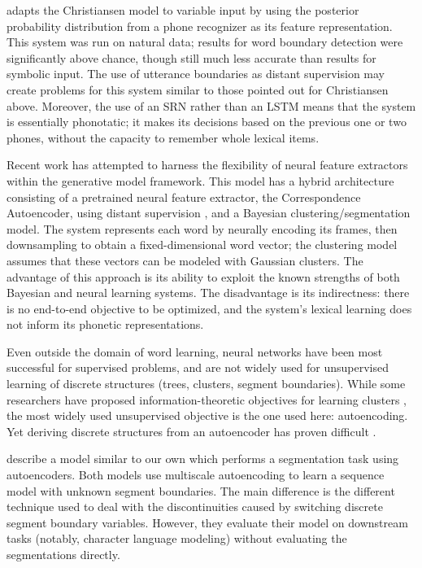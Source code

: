 \documentclass[11pt,letterpaper]{article}
\begin{document}
 adapts the Christiansen model to variable input by
using the posterior probability distribution from a phone recognizer
as its feature representation. This system was run on natural data;
results for word boundary detection were significantly above chance,
though still much less accurate than results for symbolic input. The
use of utterance boundaries as distant supervision may create problems
for this system similar to those pointed out for Christiansen
above. Moreover, the use of an SRN rather than an LSTM means that the
system is essentially phonotatic; it makes its decisions based on the
previous one or two phones, without the capacity to remember whole
lexical items.

Recent work \cite{Kamper16} has attempted to harness the flexibility
of neural feature extractors within the generative model
framework. This model has a hybrid architecture consisting of a
pretrained neural feature extractor, the Correspondence Autoencoder,
using distant supervision \cite{Kamper15}, and a Bayesian
clustering/segmentation model. The system represents each word by
neurally encoding its frames, then downsampling to obtain a
fixed-dimensional word vector; the clustering model assumes that these
vectors can be modeled with Gaussian clusters. The advantage of this
approach is its ability to exploit the known strengths of both
Bayesian and neural learning systems. The disadvantage is its
indirectness: there is no end-to-end objective to be optimized, and
the system's lexical learning does not inform its phonetic
representations.

Even outside the domain of word learning, neural networks have been
most successful for supervised problems, and are not widely used for
unsupervised learning of discrete structures (trees, clusters, segment
boundaries). While some researchers have proposed
information-theoretic objectives for learning clusters
\cite{Klapper01}, the most widely used unsupervised objective is the
one used here: autoencoding. Yet deriving discrete structures from an
autoencoder has proven difficult \cite{has-anyone-done-it}.

 describe a model similar to our own which performs a
segmentation task using autoencoders. Both models use multiscale
autoencoding to learn a sequence model with unknown segment
boundaries. The main difference is the different technique used to
deal with the discontinuities caused by switching discrete segment
boundary variables. However, they evaluate their model on downstream
tasks (notably, character language modeling) without evaluating the
segmentations directly.
\end{document}
